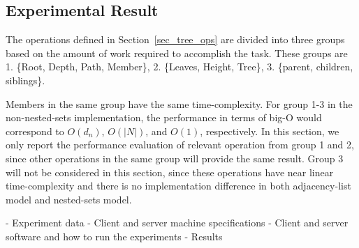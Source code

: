 \subsection{Experimental Result}\label{sec_rt_eval_result}

The operations defined in Section~\ref{sec_tree_ops} are divided into three groups based on the amount of work required to accomplish the task. These groups are 1. \{Root, Depth, Path, Member\}, 2. \{Leaves, Height, Tree\}, 3. \{parent, children, siblings\}.

Members in the same group have the same time-complexity. For group 1-3 in the non-nested-sets implementation, the performance in terms of big-O would correspond to $O(d_n)$, $O(|N|)$, and $O(1)$, respectively. In this section, we only report the performance evaluation of relevant operation from group 1 and 2, since other operations in the same group will provide the same result. Group 3 will not be considered in this section, since these operations have near linear time-complexity and there is no implementation difference in both adjacency-list model and nested-sets model.




- Experiment data
- Client and server machine specifications
- Client and server software and how to run the experiments
- Results